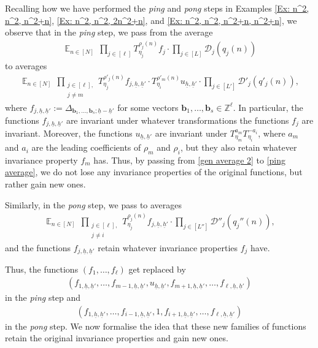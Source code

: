 \documentclass[11pt]{amsart}
\theoremstyle{definition}
\newcommand{\Z}{{\mathbb Z}}
\newcommand{\CD}{{\mathcal D}}
\renewcommand{\b}{{\textbf{b}}}
\newcommand{\uh}{{\underline{h}}}
\DeclareMathOperator*{\E}{\mathbb{E}}
\begin{document}
Recalling how we have performed the \textit{ping} and \textit{pong} steps in Examples \ref{Ex: n^2, n^2, n^2+n}, \ref{Ex: n^2, n^2, 2n^2+n}, and \ref{Ex: n^2, n^2, n^2+n, n^2+n}, we observe that in the \textit{ping} step, we pass from the average
\begin{align}\label{gen average 2}
        \E_{n\in [N]} \,\prod_{j\in[\ell]}T_{\eta_j}^{\rho_j(n)}f_j \cdot \prod_{j\in[L]}\CD_{j}(q_j(n))
\end{align}
to averages
\begin{align}\label{ping average}
  \E_{n\in[N]}\,\prod_{\substack{j\in[\ell],\\ j\neq m}}T_{\eta_j}^{\rho'_j(n)}f_{j, \uh, \uh'} \cdot T_{\eta_i}^{\rho'_m(n)}u_{\uh, \uh'} \cdot \prod_{j\in[L']}\CD'_{j}(q'_j(n)),
\end{align}
where $f_{j, \uh, \uh'}:= \Delta_{\b_1, \ldots, \b_s; \uh-\uh'}$ for some vectors $\b_1, \ldots, \b_s\in\Z^\ell$. In particular, the functions $f_{j, \uh, \uh'}$ are invariant under whatever transformations the functions $f_j$ are invariant. Moreover, the functions $u_{\uh, \uh'}$ are invariant under $T_{\eta_m}^{a_m}T_{\eta_i}^{-a_i}$, where $a_m$ and $a_i$ are the leading coefficients of $\rho_m$ and $\rho_i$, but they also retain whatever invariance property $f_m$ has. Thus, by passing from \eqref{gen average 2} to \eqref{ping average}, we do not lose any invariance properties of the original functions, but rather gain new ones.

Similarly, in the \textit{pong} step, we pass to averages
\begin{align*}
  \E_{n\in[N]}\,\prod_{\substack{j\in[\ell],\\ j\neq i}}T_{\eta_j}^{\rho_j(n)}f_{j, \uh, \uh'} \cdot \prod_{j\in[L'']}\CD''_{j}(q_j''(n)),
\end{align*}
and the functions $f_{j, \uh, \uh'}$ retain whatever invariance properties $f_j$ have.


Thus, the functions $(f_1, \ldots, f_\ell)$ get replaced by
\begin{align}\label{E: function tuple 1}
    (f_{1, \uh, \uh'}, \ldots, f_{m-1, \uh, \uh'}, u_{\uh, \uh'}, f_{m+1, \uh, \uh'}, \ldots, f_{\ell, \uh, \uh'})
\end{align}
in the \textit{ping} step and
\begin{align}\label{E: function tuple 2}
    (f_{1, \uh, \uh'}, \ldots, f_{i-1, \uh, \uh'}, 1, f_{i+1, \uh, \uh'}, \ldots, f_{\ell, \uh, \uh'})
\end{align}
in the \textit{pong} step. We now formalise the idea that these new families of functions retain the original invariance properties and gain new ones.
\end{document}
